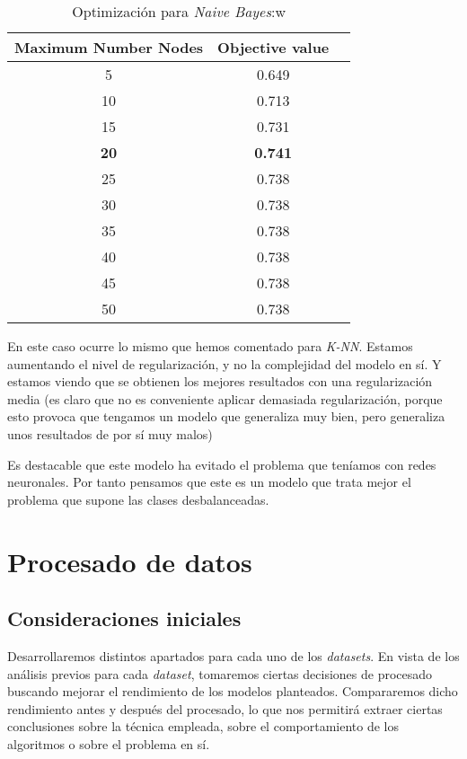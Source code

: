 \documentclass[11pt]{article}
\begin{document}
\begin{table}[H]
\begin{center}
    \begin{tabular}{|c|c|c|}
        \hline
        Maximum Number Nodes & Objective value \\
        \hline
        5 & 0.649 \\
        10 & 0.713 \\
        15 & 0.731 \\
        \textbf{20} & \textbf{0.741} \\
        25 & 0.738 \\
        30 & 0.738 \\
        35 & 0.738 \\
        40 & 0.738 \\
        45 & 0.738 \\
        50 & 0.738 \\

        \hline
    \end{tabular}
\end{center}
    \caption{Optimización para \emph{Naive Bayes}:w
    }
\end{table}

En este caso ocurre lo mismo que hemos comentado para \emph{K-NN}. Estamos aumentando el nivel de regularización, y no la complejidad del modelo en sí. Y estamos viendo que se obtienen los mejores resultados con una regularización media (es claro que no es conveniente aplicar demasiada regularización, porque esto provoca que tengamos un modelo que generaliza muy bien, pero generaliza unos resultados de por sí muy malos)

Es destacable que este modelo ha evitado el problema que teníamos con redes neuronales. Por tanto pensamos que este es un modelo que trata mejor el problema que supone las clases desbalanceadas.

\pagebreak

\section{Procesado de datos}

\subsection{Consideraciones iniciales}

Desarrollaremos distintos apartados para cada uno de los \emph{datasets}. En vista de los análisis previos para cada \emph{dataset}, tomaremos ciertas decisiones de procesado buscando mejorar el rendimiento de los modelos planteados. Compararemos dicho rendimiento antes y después del procesado, lo que nos permitirá extraer ciertas conclusiones sobre la técnica empleada, sobre el comportamiento de los algoritmos o sobre el problema en sí.
\end{document}
